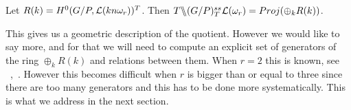 \begin{theorem}
Let $R(k) = H^0(G/P, {\cal L}(kn\omega_r))^T$. Then $T \backslash\mkern-6mu\backslash (G/P)^{ss}_T{{\cal L}(\omega_r)} = Proj(\oplus_k R(k))$.
\end{theorem}

This gives us a geometric description of the quotient. However we would like to say more, and for that we will need to compute an explicit set of generators of the ring $\oplus_k R(k)$
and relations between them. When $r=2$ this is known, see ~\cite{howard2005projective},~\cite{bakshi2020torus}. However this becomes difficult when $r$ is bigger than or equal to three since there are too many generators and this has to be done more systematically. This is what we address in the next section.


